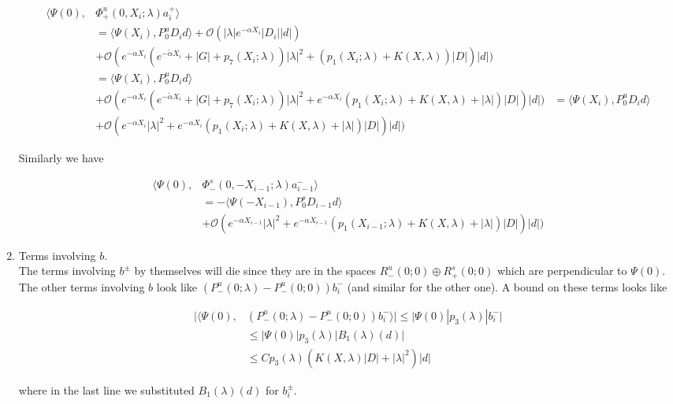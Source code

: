 \documentclass[12pt]{article}
\begin{document}
\begin{enumerate}
\begin{align*}
\langle \Psi(0), &\Phi^u_+(0, X_i; \lambda) a_i^+ \rangle \\
&= \langle \Psi(X_i), P^u_0 D_i d \rangle  + \mathcal{O}(|\lambda| e^{-\alpha X_i}|D_i||d|) \\
&+ \mathcal{O}(e^{-\alpha X_i}(e^{-\tilde{\alpha} X_i} + |G| + p_7(X_i; \lambda))|\lambda|^2 + (p_1(X_i; \lambda) + K(X, \lambda) ) |D|)|d|) \\
&= \langle \Psi(X_i), P^u_0 D_i d \rangle \\
&+ \mathcal{O}(e^{-\alpha X_i}(e^{-\tilde{\alpha} X_i} + |G| + p_7(X_i; \lambda))|\lambda|^2 + e^{-\alpha X_i}(p_1(X_i; \lambda) + K(X, \lambda) + |\lambda|) |D|)|d|)
&= \langle \Psi(X_i), P^u_0 D_i d \rangle \\
&+ \mathcal{O}(e^{-\alpha X_i}|\lambda|^2 + e^{-\alpha X_i}(p_1(X_i; \lambda) + K(X, \lambda) + |\lambda|) |D|)|d|)
\end{align*}

Similarly we have

\begin{align*}
\langle \Psi(0), &\Phi^s_-(0, -X_{i-1}; \lambda)a_{i-1}^- \rangle \\
&= -\langle \Psi(-X_{i-1}), P^s_0 D_{i-1} d \rangle \\
&+ \mathcal{O}(e^{-\alpha X_{i-1}}|\lambda|^2 + e^{-\alpha X_{i-1}}(p_1(X_{i-1}; \lambda) + K(X, \lambda) + |\lambda|) |D|)|d|)
\end{align*}

\item Terms involving $b$.\\

The terms involving $b^\pm$ by themselves will die since they are in the spaces $R^u_-(0; 0) \oplus R^s_+(0; 0)$ which are perpendicular to $\Psi(0)$.\\

The other terms involving $b$ look like $(P^u_-(0; \lambda) - P^u_-(0; 0))b_i^-$ (and similar for the other one). A bound on these terms looks like

\begin{align*}
|\langle \Psi(0), &(P^u_-(0; \lambda) - P^u_-(0; 0))b_i^- \rangle|
\leq |\Psi(0)| p_3(\lambda)|b_i^-| \\
&\leq |\Psi(0)| p_3(\lambda)|B_1(\lambda)(d)| \\
&\leq C p_3(\lambda) ( K(X, \lambda) |D|+ |\lambda|^2 )|d|
\end{align*}

where in the last line we substituted $B_1(\lambda)(d)$ for $b_i^\pm$.\\


\end{enumerate}
\end{document}
